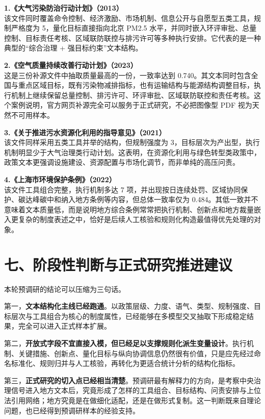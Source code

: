 \textbf{1.《大气污染防治行动计划》（2013）}\\
该文件同时覆盖命令控制、经济激励、市场机制、信息公开与自愿型五类工具，规制严格度为
5，量化目标直接指向北京 PM2.5
水平，并同时嵌入环评审批、总量控制、目标责任考核、区域联防联控与排污许可等多种执行安排。它代表的是一种典型的``综合治理
+ 强目标约束''文本结构。

\textbf{2.《空气质量持续改善行动计划》（2023）}\\
这是三份补源文件中抽取质量最高的一份，一致率达到
0.740。其文本同时包含全国与重点区域目标，既有污染物减排指标，也有运输结构与能源结构调整目标，执行机制上继续保留总量控制、排污许可、环评审批、区域联防联控和责任考核。这个案例说明，官方网页补源完全可以服务于正式研究，不必把图像型
PDF 视为天然不可用样本。

\textbf{3.《关于推进污水资源化利用的指导意见》（2021）}\\
该文件同样采用五类工具并举的结构，但规制强度为
3，目标层次为产出型，执行机制明显少于大气治理类行动计划。这表明，在资源化利用与绿色转型类政策中，政策文本更强调设施建设、资源配置与市场化调节，而非单纯的高压问责。

\textbf{4.《上海市环境保护条例》（2022）}\\
该文件工具组合完整，执行机制多达 7
项，并出现按日连续处罚、区域协同保护、碳达峰碳中和纳入地方条例等内容，但总体一致率仅为
0.484。其低一致并不意味着文本质量低，而是说明地方综合条例常常把执行机制、创新点和地方裁量嵌入更复杂的制度表述之中，恰好是后续人工核验和规则化构造最值得优先处理的对象。

\section{七、阶段性判断与正式研究推进建议}

本轮预调研的结论可以压缩为三句话。

第一，\textbf{文本结构化主线已经跑通}。以政策层级、力度、语气、类型、规制强度、目标层次与工具组合为核心的制度属性，已经能够在多模型交叉抽取下形成稳定结果，完全可以进入正式样本扩展。

第二，\textbf{开放式字段不宜直接入模，但已经足以支撑规则化派生变量设计}。执行机制、关键措施、创新点、量化目标与纵向协调信息仍然很有价值，只是应先经过命名标准化、规则归并与人工核验，再转化为更适合统计分析的结构化指标。

第三，\textbf{正式研究的切入点已经相当清楚}。预调研最有解释力的方向，是考察中央治理信号进入地方文本后，究竟形成了怎样的工具组合、目标结构、问责安排与上位法引用网络；地方究竟是在做细化适配，还是在做形式复制。这一判断既来自理论问题，也已经得到预调研样本的经验支持。

